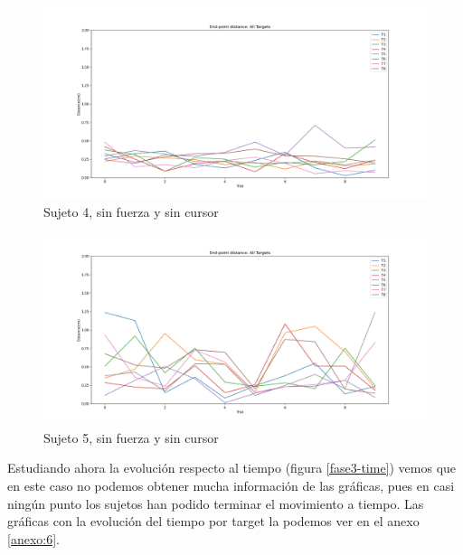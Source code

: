 \documentclass[a4paper,11pt, oneside]{book}
\begin{document}
\begin{figure}[H]
	\includegraphics[width=\linewidth]{sujeto4/no_force_no_cursor/evolution_distance}
	\caption{Sujeto 4, sin  fuerza y sin cursor}
	\label{4-3-3}
\end{figure}
\begin{figure}[H]
	\includegraphics[width=\linewidth]{sujeto5/no_force_no_cursor/evolution_distance}
	\caption{Sujeto 5, sin  fuerza y sin cursor}
	\label{5-3-3}
\end{figure}


Estudiando ahora la evolución respecto al tiempo (figura \ref{fase3-time}) vemos que en este caso no podemos obtener mucha información de las gráficas, pues en casi ningún punto los sujetos han podido terminar el movimiento a tiempo. Las gráficas con la evolución del tiempo por target la podemos ver en el anexo \ref{anexo:6}.
\end{document}
